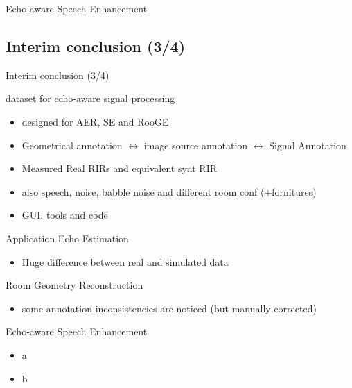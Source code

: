 \begin{frame}{Echo-aware Speech Enhancement}

\end{frame}

\subsection*{Interim conclusion (3/4)}

\begin{frame}{Interim conclusion (3/4)}
    \begin{block}{\dechorate dataset for echo-aware signal processing}
        \begin{itemize}
            \item designed for AER, SE and RooGE
            \item Geometrical annotation $\longleftrightarrow$ image source annotation $\longleftrightarrow$ Signal Annotation
            \item Measured Real RIRs and equivalent synt RIR
            \item also speech, noise, babble noise and different room conf (+fornitures)
            \item GUI, tools and code
        \end{itemize}
    \end{block}

    \begin{block}{Application}
        Echo Estimation
        \begin{itemize}
            \item Huge difference between real and simulated data
        \end{itemize}
        Room Geometry Reconstruction
        \begin{itemize}
            \item some annotation inconsistencies are noticed (but manually corrected)
        \end{itemize}
        Echo-aware Speech Enhancement
        \begin{itemize}
            \item a
            \item b
        \end{itemize}
    \end{block}
\end{frame}